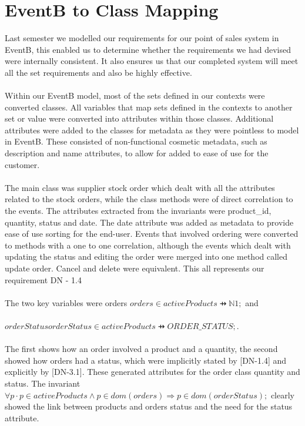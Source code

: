 \documentclass[a4paper]{article}
\begin{document}
\section{EventB to Class Mapping}
Last semester we modelled our requirements for our point of sales system in EventB, this enabled us to determine whether the requirements we had devised were internally consistent. It also ensures us that our completed system will meet all the set requirements and also be highly effective.
\\\\
Within our EventB model, most of the sets defined in our contexts were converted classes. All variables that map sets defined in the contexts to another set or value were converted into attributes within those classes. Additional attributes were added to the classes for metadata as they were pointless to model in EventB. These consisted of non-functional cosmetic metadata, such as description and name attributes, to allow for added to ease of use for the customer.
\\\\
The main class was supplier stock order which dealt with all the attributes related to the stock orders, while the class methods were of direct correlation to the events. The attributes extracted from the invariants were product\_id, quantity, status and date. The date attribute was added as metadata to provide ease of use sorting for the end-user. Events that involved ordering were converted to methods with a one to one correlation, although the events which dealt with updating the status and editing the order were merged into one method called update order. Cancel and delete were equivalent. This all represents our requirement DN - 1.4
\\\\
The two key variables were orders \(orders \in activeProducts ⇸ \mathbb{N}1;\) and\\\\ \(orderStatus orderStatus \in activeProducts ⇸ ORDER\_STATUS;\).\\\\
The first shows how an order involved a product and a quantity, the second showed how orders had a status, which were implicitly stated by [DN-1.4] and explicitly by [DN-3.1]. These generated attributes for the order class quantity and status. The invariant \(\forall p \cdot p \in activeProducts ∧ p \in dom(orders) \Rightarrow p \in dom(orderStatus);\) clearly showed the link between products and orders status and the need for the status attribute.
\end{document}
